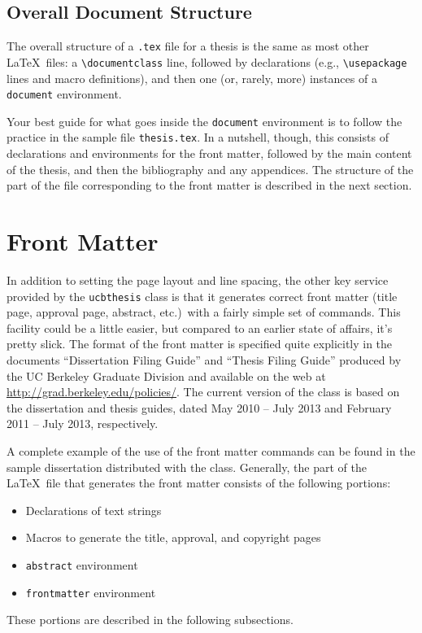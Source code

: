 \documentclass[11pt]{article}
\newcommand*{\pkg}[1]{\texttt{#1}}
\begin{document}
\subsection{Overall Document Structure}

The overall structure of a \verb|.tex| file for a thesis is the same as
most other \LaTeX\ files:  a \verb|\documentclass| line, followed by
declarations (e.g., \verb|\usepackage| lines and macro definitions),
and then one (or, rarely, more) instances of a \verb|document| environment.

Your best guide for what goes inside the \verb|document| environment is
to follow the practice in the sample file \verb|thesis.tex|.  In a nutshell,
though, this consists of declarations and environments for the front matter,
followed by the main content of the thesis, and then the bibliography
and any appendices.  The structure of the part of the file
corresponding to the front matter is described in the next section.

\section{Front Matter}

In addition to setting the page layout and line spacing, the other key
service provided by the \pkg{ucbthesis} class is that it generates
correct front matter (title page, approval page, abstract, etc.)\ with
a fairly simple set of commands.  This facility could be a little
easier, but compared to an earlier state of affairs, it's pretty
slick.  The format of the front matter is specified quite explicitly
in the documents ``Dissertation Filing Guide'' and ``Thesis Filing Guide''
produced by the UC Berkeley Graduate Division and available on the web at
\url{http://grad.berkeley.edu/policies/}.
The current version of the class is based on the dissertation and thesis
guides, dated May 2010 -- July 2013 and February 2011 -- July 2013,
respectively.

A complete example of the use of the front matter commands can be
found in the sample dissertation distributed with the class.
Generally, the part of the \LaTeX\ file that generates the front matter
consists of the following portions:
\begin{itemize}
\item Declarations of text strings
\item Macros to generate the title, approval, and copyright pages
\item \verb|abstract| environment
\item \verb|frontmatter| environment
\end{itemize}
These portions are described in the following subsections.
\end{document}
